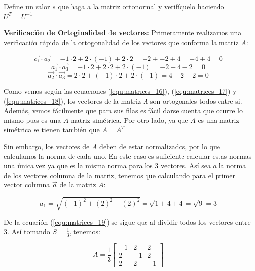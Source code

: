 \documentclass{article}
\begin{document}
\begin{enumerate}
Define un valor $s$ que haga a la matriz ortonormal y verifíquelo haciendo $U^T = U^{-1}$

\vspace{0.5cm}
\textbf{Verificación de Ortoginalidad de vectores:}
Primeramente realizamos una verificación rápida de la ortogonalidad de los vectores que conforma la matriz $A$:

\begin{equation}
\label{equ:matrices_16}
\vec{a_1}\cdot\vec{a_2} = -1\cdot2 + 2\cdot(-1) + 2\cdot2 = -2 + -2 + 4 = -4+4=0
\end{equation}
\begin{equation}
\label{equ:matrices_17}
\vec{a_1}\cdot\vec{a_3} = -1\cdot2 + 2\cdot2 + 2\cdot(-1) = -2 + 4 - 2 = 0
\end{equation}
\begin{equation}
\label{equ:matrices_18}
\vec{a_2}\cdot\vec{a_3} = 2\cdot2 + (-1)\cdot2 + 2\cdot(-1) = 4 - 2 - 2 = 0
\end{equation}

Como vemos según las ecuaciones (\ref{equ:matrices_16}), (\ref{equ:matrices_17}) y (\ref{equ:matrices_18}), los vectores de la matriz $A$ son ortogonales todos entre si. Además, vemos fácilmente que para sus filas es fácil darse cuenta que ocurre lo mismo pues es una $A$ matriz simétrica. Por otro lado, ya que $A$ es una matriz simétrica se tienen también que $A = A^T$

Sin embargo, los vectores de $A$ deben de estar normalizados, por lo que calculamos la norma de cada uno. En este caso es suficiente calcular estas normas una única vez ya que es la misma norma para los 3 vectores. Así sea $a$ la norma de los vectores columna de la matriz, tenemos que calculando para el primer vector columna $\vec{a}$ de la matriz $A$:

\begin{equation}
\label{equ:matrices_19}
a_1 = \sqrt{(-1)^2 + (2)^2 + (2)^2} = \sqrt{1 + 4 + 4} = \sqrt{9} = 3
\end{equation}

De la ecuación (\ref{equ:matrices_19}) se sigue que al dividir todos los vectores entre 3. Así tomando $S = \frac{1}{3}$, tenemos: 

\begin{equation}
\label{equ:matrices_20}
A = \frac{1}{3}\begin{bmatrix}
-1 & 2 & 2 \\
2 & -1 & 2 \\
2 & 2 & -1
\end{bmatrix}
\end{equation}


\end{enumerate}
\end{document}
